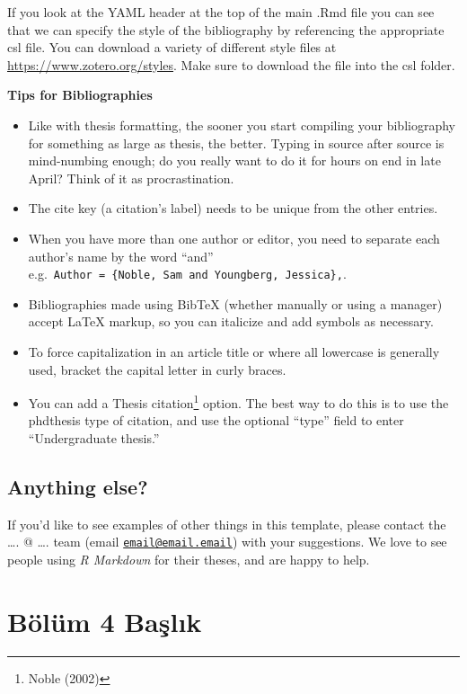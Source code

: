 \documentclass[12pt,twoside]{deuthesis}
\providecommand{\tightlist}{%
  \setlength{\itemsep}{0pt}\setlength{\parskip}{0pt}}
\begin{document}
If you look at the YAML header at the top of the main .Rmd file you can see that we can specify the style of the bibliography by referencing the appropriate csl file. You can download a variety of different style files at \url{https://www.zotero.org/styles}. Make sure to download the file into the csl folder.

\textbf{Tips for Bibliographies}
\begin{itemize}
\tightlist
\item
  Like with thesis formatting, the sooner you start compiling your bibliography for something as large as thesis, the better. Typing in source after source is mind-numbing enough; do you really want to do it for hours on end in late April? Think of it as procrastination.
\item
  The cite key (a citation's label) needs to be unique from the other entries.
\item
  When you have more than one author or editor, you need to separate each author's name by the word ``and'' e.g.~\texttt{Author\ =\ \{Noble,\ Sam\ and\ Youngberg,\ Jessica\},}.
\item
  Bibliographies made using BibTeX (whether manually or using a manager) accept LaTeX markup, so you can italicize and add symbols as necessary.
\item
  To force capitalization in an article title or where all lowercase is generally used, bracket the capital letter in curly braces.
\item
  You can add a Thesis citation\footnote{Noble (2002)} option. The best way to do this is to use the phdthesis type of citation, and use the optional ``type'' field to enter ``Undergraduate thesis.''
\end{itemize}
\hypertarget{anything-else}{%
\section{Anything else?}\label{anything-else}}

If you'd like to see examples of other things in this template, please contact the \ldots. @ \ldots. team (email \href{mailto:email@email.email}{\nolinkurl{email@email.email}}) with your suggestions. We love to see people using \emph{R Markdown} for their theses, and are happy to help.

\hypertarget{Bolum4}{%
\chapter{Bölüm 4 Başlık}\label{Bolum4}}
\end{document}
